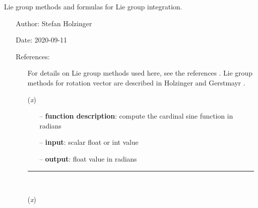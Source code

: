 \begin{itemize}[leftmargin=1.4cm]
\begin{itemize}[leftmargin=0.5cm]
\begin{itemize}[leftmargin=1.4cm]
\begin{itemize}[leftmargin=1.4cm]
\begin{itemize}[leftmargin=0.5cm]
\begin{itemize}[leftmargin=1.4cm]
\begin{itemize}[leftmargin=0.5cm]
\begin{itemize}[leftmargin=1.4cm]
\begin{itemize}[leftmargin=1.4cm]
\begin{itemize}[leftmargin=1.4cm]
\begin{itemize}[leftmargin=0.7cm]
\begin{itemize}[leftmargin=1.2cm]
  \end{itemize}
\vspace{12pt}\end{itemize}
%
\label{sec:module:lieGroupBasics}
  Lie group methods and formulas for Lie group integration.
\begin{itemize}[leftmargin=1.4cm]
\setlength{\itemindent}{-1.4cm}
\item[]Author:    Stefan Holzinger
\item[]Date:      2020-09-11
\item[]References:
\vspace{-22pt}\begin{itemize}[leftmargin=0.5cm]
\setlength{\itemindent}{-0.5cm}
\item[]   
\item[]               For details on Lie group methods used here, see the references \cite{Henderson1977, Simo1988, Bruels2011, Sonneville2014, Sonneville2017, Terze2016, Mueller2017}.               Lie group methods for rotation vector are described in Holzinger and Gerstmayr \cite{HolzingerGerstmayr2020, Holzinger2021}.               
\ei
\ei
\begin{flushleft}
\label{sec:lieGroupBasics:Sinc}
({\it x})
\end{flushleft}
\setlength{\itemindent}{0.7cm}
\begin{itemize}[leftmargin=0.7cm]
  \item[--]  {\bf function description}: compute the cardinal sine function in radians  \item[--]  {\bf input}: scalar float or int value  \item[--]  {\bf output}: float value in radians\vspace{12pt}\end{itemize}
%
\noindent\rule{8cm}{0.75pt}\vspace{1pt} \\ 
\begin{flushleft}
\label{sec:lieGroupBasics:Cot}
({\it x})
\end{flushleft}
\setlength{\itemindent}{0.7cm}
\begin{itemize}[leftmargin=0.7cm]

\end{itemize}
\end{itemize}
\end{itemize}
\end{itemize}
\end{itemize}
\end{itemize}
\end{itemize}
\end{itemize}
\end{itemize}
\end{itemize}
\end{itemize}
\end{itemize}
\end{itemize}
